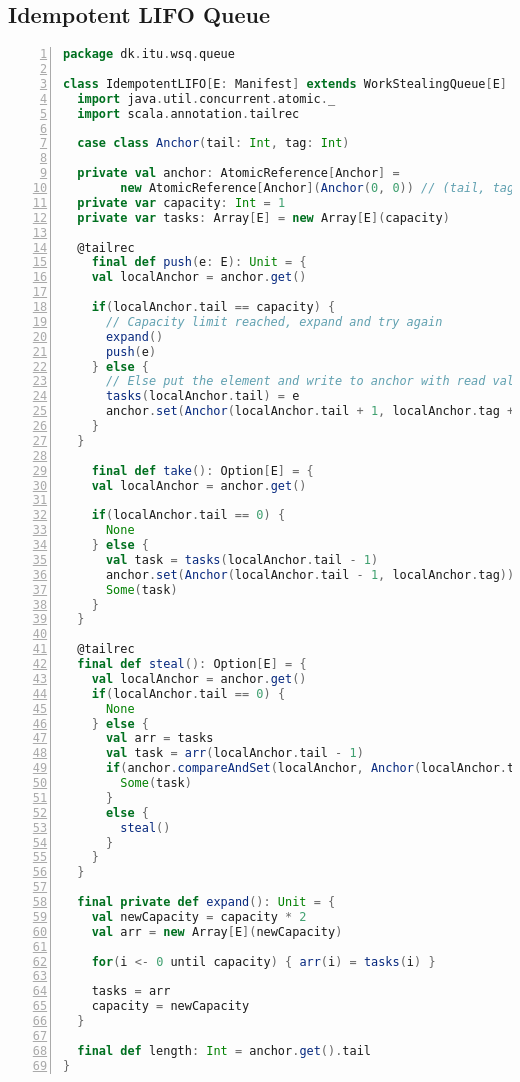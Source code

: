 \subsection{Idempotent LIFO Queue}
\begin{lstlisting}[language=scala,basicstyle=\ttfamily\bfseries\scriptsize,numbers=left]
package dk.itu.wsq.queue

class IdempotentLIFO[E: Manifest] extends WorkStealingQueue[E] {
  import java.util.concurrent.atomic._
  import scala.annotation.tailrec

  case class Anchor(tail: Int, tag: Int)

  private val anchor: AtomicReference[Anchor] = 
  		new AtomicReference[Anchor](Anchor(0, 0)) // (tail, tag)
  private var capacity: Int = 1
  private var tasks: Array[E] = new Array[E](capacity)

  @tailrec
	final def push(e: E): Unit = {    
    val localAnchor = anchor.get()

    if(localAnchor.tail == capacity) {
      // Capacity limit reached, expand and try again
      expand() 
      push(e)
    } else {
      // Else put the element and write to anchor with read values plus one
      tasks(localAnchor.tail) = e
      anchor.set(Anchor(localAnchor.tail + 1, localAnchor.tag + 1))
    }
  }

	final def take(): Option[E] = {    
    val localAnchor = anchor.get()

    if(localAnchor.tail == 0) {
      None
    } else {
      val task = tasks(localAnchor.tail - 1)
      anchor.set(Anchor(localAnchor.tail - 1, localAnchor.tag))
      Some(task)
    }
  }

  @tailrec
  final def steal(): Option[E] = {
    val localAnchor = anchor.get()
    if(localAnchor.tail == 0) {
      None
    } else {
      val arr = tasks
      val task = arr(localAnchor.tail - 1)
      if(anchor.compareAndSet(localAnchor, Anchor(localAnchor.tail - 1, localAnchor.tag))) {
        Some(task)
      }
      else {
        steal()
      }
    }
  }

  final private def expand(): Unit = {
    val newCapacity = capacity * 2
    val arr = new Array[E](newCapacity)

    for(i <- 0 until capacity) { arr(i) = tasks(i) }

    tasks = arr
    capacity = newCapacity
  }

  final def length: Int = anchor.get().tail
}
\end{lstlisting}

